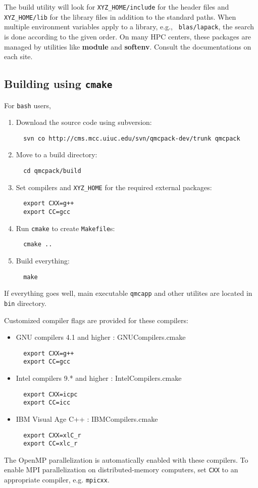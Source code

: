 The build utility \cmake will look for {\tt XYZ\_HOME/include} for the header
files and \texttt{XYZ\_HOME/lib} for the library files in addition to the standard
paths.  When multiple environment variables apply to a library, e.g., {\tt
blas/lapack}, the search is done according to the given  order.  On many HPC
centers, these packages are managed by utilities like \textbf{module} and
\textbf{softenv}. Consult the documentations on each site. 

\subsection{Building using {\tt cmake}}\label{cmake.sec}

For {\tt bash} users,
\begin{enumerate}
\item Download the source code using subversion:
\begin{lstlisting}
  svn co http://cms.mcc.uiuc.edu/svn/qmcpack-dev/trunk qmcpack
\end{lstlisting}
\item Move to a build directory:
\begin{lstlisting}
  cd qmcpack/build
\end{lstlisting}
\item Set compilers and \texttt{XYZ\_HOME} for the required external packages:
\begin{lstlisting}
  export CXX=g++
  export CC=gcc
\end{lstlisting}
\item Run {\tt cmake} to create \nolinkurl{Makefile}s:
\begin{lstlisting}
  cmake ..
\end{lstlisting}
\item Build everything:
\begin{lstlisting}
  make
\end{lstlisting}
\end{enumerate}

If everything goes well, main executable {\tt qmcapp} and other utilites are
located in {\tt bin} directory. 

Customized compiler flags are provided for these compilers:
\begin{itemize}
\item{}GNU compilers 4.1 and higher : GNUCompilers.cmake 
\begin{lstlisting}
  export CXX=g++
  export CC=gcc
\end{lstlisting}
\item{}Intel compilers 9.* and higher : IntelCompilers.cmake 
\begin{lstlisting}
  export CXX=icpc
  export CC=icc
\end{lstlisting}
\item{}IBM Visual Age C++ : IBMCompilers.cmake
\begin{lstlisting}
  export CXX=xlC_r
  export CC=xlc_r
\end{lstlisting}
\end{itemize}
The OpenMP parallelization is automatically enabled with these compilers. To
enable MPI parallelization on distributed-memory computers, set {\tt CXX} to an
appropriate compiler, e.g. {\tt mpicxx}.
  
